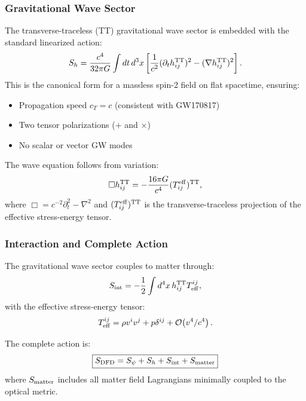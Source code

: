 \subsubsection{Gravitational Wave Sector}

The transverse-traceless (TT) gravitational wave sector is embedded with 
the standard linearized action:
\begin{equation}
S_h = \frac{c^4}{32\pi G}\int dt\,d^3x \left[
  \frac{1}{c^2}(\partial_t h_{ij}^{\rm TT})^2 - (\nabla h_{ij}^{\rm TT})^2
\right].
\label{eq:action_gw}
\end{equation}
This is the canonical form for a massless spin-2 field on flat spacetime, 
ensuring:
\begin{itemize}
\item Propagation speed $c_T = c$ (consistent with GW170817)
\item Two tensor polarizations ($+$ and $\times$)
\item No scalar or vector GW modes
\end{itemize}
The wave equation follows from variation:
\begin{equation}
\Box h_{ij}^{\rm TT} = -\frac{16\pi G}{c^4}(T_{ij}^{\rm eff})^{\rm TT},
\label{eq:wave_equation}
\end{equation}
where $\Box = c^{-2}\partial_t^2 - \nabla^2$ and $(T_{ij}^{\rm eff})^{\rm TT}$ 
is the transverse-traceless projection of the effective stress-energy tensor.

\subsubsection{Interaction and Complete Action}

The gravitational wave sector couples to matter through:
\begin{equation}
S_{\rm int} = -\frac{1}{2}\int d^4x\,h_{ij}^{\rm TT} T^{ij}_{\rm eff},
\end{equation}
with the effective stress-energy tensor:
\begin{equation}
T^{ij}_{\rm eff} = \rho v^i v^j + p\delta^{ij} + \mathcal{O}\!\left(v^4/c^4\right).
\end{equation}

The complete \DFD action is:
\begin{equation}
\boxed{
S_{\rm DFD} = S_\psi + S_h + S_{\rm int} + S_{\rm matter}
}
\label{eq:complete_action}
\end{equation}
where $S_{\rm matter}$ includes all matter field Lagrangians minimally 
coupled to the optical metric.

